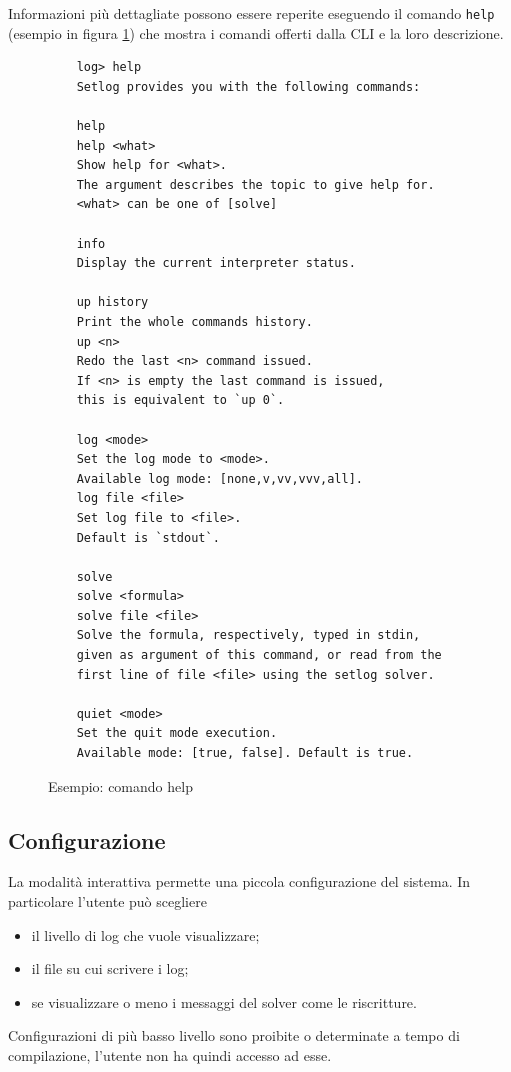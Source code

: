 \documentclass[12pt,a4paper,openright]{book} %
\begin{document}
Informazioni più dettagliate possono essere reperite eseguendo il
comando \texttt{help} (esempio in figura
\ref{fig:example_helpcommand}) che mostra i comandi offerti dalla CLI
e la loro descrizione.

\begin{figure}
	\begin{verbatim}
	log> help
	Setlog provides you with the following commands:

	help
	help <what>
	Show help for <what>.
	The argument describes the topic to give help for.
	<what> can be one of [solve]

	info
	Display the current interpreter status.

	up history
	Print the whole commands history.
	up <n>
	Redo the last <n> command issued.
	If <n> is empty the last command is issued,
	this is equivalent to `up 0`.

	log <mode>
	Set the log mode to <mode>.
	Available log mode: [none,v,vv,vvv,all].
	log file <file>
	Set log file to <file>.
	Default is `stdout`.

	solve
	solve <formula>
	solve file <file>
	Solve the formula, respectively, typed in stdin,
	given as argument of this command, or read from the
	first line of file <file> using the setlog solver.

	quiet <mode>
	Set the quit mode execution.
	Available mode: [true, false]. Default is true.
	\end{verbatim}

	\caption{Esempio: comando help}
	\label{fig:example_helpcommand}
\end{figure}

\subsection{Configurazione}

La modalità interattiva permette una piccola configurazione del
sistema. In particolare l'utente può scegliere
\begin{itemize}
	\item il livello di log che vuole visualizzare;
	\item il file su cui scrivere i log;
	\item se visualizzare o meno i messaggi del solver come le
          riscritture.
\end{itemize}

Configurazioni di più basso livello sono proibite o determinate a
tempo di compilazione, l'utente non ha quindi accesso ad esse.
\end{document}
